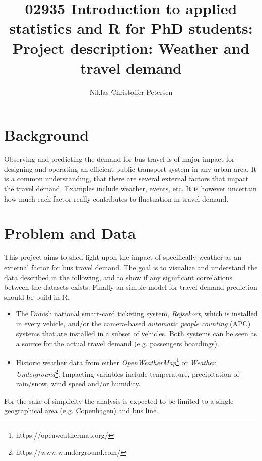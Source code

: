 \documentclass[a4paper,11pt]{article}
\title{{\small 02935 Introduction to applied statistics and R for PhD students: }\\[1em]Project description: Weather and travel demand}
\author{Niklas Christoffer Petersen}
\begin{document}
\singlespace
\maketitle

\onehalfspacing

\section{Background}\label{ch:background}

Observing and predicting the demand for bus travel is of major impact for designing and operating an efficient public transport system in any urban area. It is a common understanding, that there are several external factors that impact the travel demand. Examples include weather, events, etc. It is however uncertain how much each factor really contributes to fluctuation in travel demand. 

\section{Problem and Data}\label{ch:data}
This project aims to shed light upon the impact of specifically weather as an external factor for bus travel demand. The goal is to visualize and understand the data described in the following, and to show if any significant correlations between the datasets exists. Finally an simple model for travel demand prediction should be build in R.

\begin{itemize}
    \item The Danish national smart-card ticketing system, \emph{Rejsekort}, which is installed in every vehicle, and/or the camera-based \emph{automatic people counting} (APC) systems that are installed in a subset of vehicles. Both systems can be seen as a source for the actual travel demand (e.g. passengers boardings).
    \item Historic weather data from either \emph{OpenWeatherMap}\footnote{https://openweathermap.org/} or \emph{Weather Underground}\footnote{https://www.wunderground.com/}. Impacting variables include temperature, precipitation of rain/snow, wind speed and/or humidity.
\end{itemize}

For the sake of simplicity the analysis is expected to be limited to a single geographical area (e.g. Copenhagen) and bus line.

\begin{spacing}{1}
  
  
\end{spacing}
\end{document}
